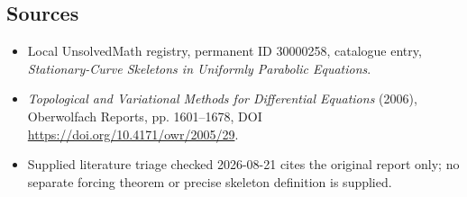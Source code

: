 \documentclass[11pt]{article}
\begin{document}
\subsection{Sources}
\begin{itemize}
\item Local UnsolvedMath registry, permanent ID 30000258, catalogue entry, \emph{Stationary-Curve Skeletons in Uniformly Parabolic Equations}.
\item \emph{Topological and Variational Methods for Differential Equations} (2006), Oberwolfach Reports, pp. 1601--1678, DOI \url{https://doi.org/10.4171/owr/2005/29}.
\item Supplied literature triage checked 2026-08-21 cites the original report only; no separate forcing theorem or precise skeleton definition is supplied.
\end{itemize}
\end{document}
